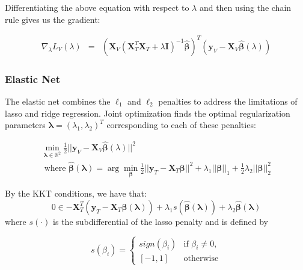 \documentclass[10pt,letterpaper]{article}
\begin{document}
Differentiating the above equation with respect to $\lambda$ and then using the chain rule gives us the gradient:

\begin{equation}
\begin{array} {lcl}
\nabla_\lambda L_V(\lambda)
&=& (\boldsymbol{X}_V(\boldsymbol{X}_T^T \boldsymbol{X}_T + \lambda \boldsymbol{I})^{-1}
\hat{\boldsymbol{\beta}})^T(\boldsymbol{y}_V - \boldsymbol{X}_V \hat{\boldsymbol{\beta}}(\lambda))
\end{array}
\end{equation}

\subsubsection{Elastic Net}

The elastic net combines the $\ell_1$ and $\ell_2$ penalties to address the limitations of lasso and ridge regression. Joint optimization finds the optimal regularization parameters $\boldsymbol{\lambda} = (\lambda_1, \lambda_2)^T$ corresponding to each of these penalties:

\begin{equation}
\begin{array}{c}
\min_{\boldsymbol{\lambda} \in \mathbb{R}^2} \frac{1}{2} \lvert\lvert \boldsymbol{y}_V - \boldsymbol{X}_V \hat{\boldsymbol{\beta}} (\lambda) \rvert\rvert ^2 \\
\text{ where }
\hat{\boldsymbol{\beta}} (\boldsymbol{\lambda}) = \arg \min_{\boldsymbol{\beta}} \frac{1}{2} \lvert\lvert \boldsymbol{y}_T - \boldsymbol{X}_T \boldsymbol{\beta} \rvert\rvert ^2
+ \lambda_1 \lvert\lvert \boldsymbol{\beta} \rvert \rvert_1
+ \frac{1}{2}\lambda_2 \lvert\lvert \boldsymbol{\beta} \rvert \rvert_2^2
\end{array}
\end{equation}

By the KKT conditions, we have that:
\begin{equation}
0 \in -\boldsymbol{X}_T^T(\boldsymbol{y}_T
- \boldsymbol{X}_T \hat{\boldsymbol{\beta}} (\boldsymbol{\lambda}) )
+ \lambda_1 s(\hat{\boldsymbol{\beta}} (\boldsymbol{\lambda}))
+ \lambda_2 \hat{\boldsymbol{\beta}} (\boldsymbol{\lambda})
\end{equation}
where $s(\cdot)$ is the subdifferential of the lasso penalty and is defined by

\begin{equation}
s(\beta_i) = \begin{cases}
  sign(\beta_i) & \text{if } \beta_i \ne 0, \\
  [-1, 1] & \text{otherwise}
\end{cases}
\end{equation}
\end{document}
